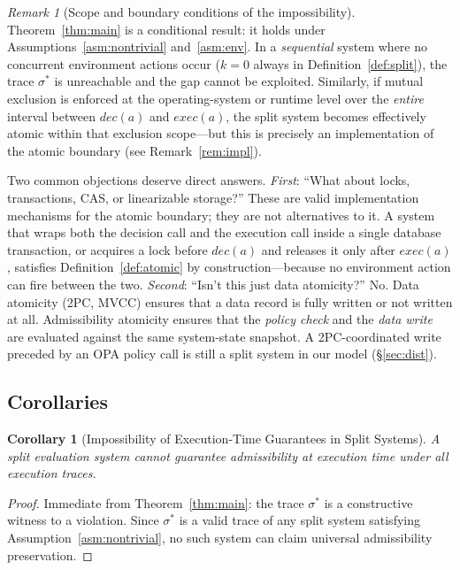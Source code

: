 \documentclass[11pt]{article}
\theoremstyle{plain}
\newtheorem{corollary}[theorem]{Corollary}
\theoremstyle{definition}
\theoremstyle{remark}
\newtheorem{remark}[theorem]{Remark}
\begin{document}
\begin{remark}[Scope and boundary conditions of the impossibility]
\label{rem:scope}
Theorem~\ref{thm:main} is a conditional result: it holds under
Assumptions~\ref{asm:nontrivial} and~\ref{asm:env}.  In a \emph{sequential}
system where no concurrent environment actions occur ($k = 0$ always in
Definition~\ref{def:split}), the trace $\sigma^*$ is unreachable and the
gap cannot be exploited.  Similarly, if mutual exclusion is enforced at the
operating-system or runtime level over the \emph{entire} interval between
$\mathit{dec}(a)$ and $\mathit{exec}(a)$, the split system becomes effectively
atomic within that exclusion scope---but this is precisely an implementation
of the atomic boundary (see Remark~\ref{rem:impl}).

Two common objections deserve direct answers.  \emph{First}: ``What about
locks, transactions, CAS, or linearizable storage?''  These are valid
implementation mechanisms for the atomic boundary; they are not alternatives
to it.  A system that wraps both the decision call and the execution call inside
a single database transaction, or acquires a lock before $\mathit{dec}(a)$ and
releases it only after $\mathit{exec}(a)$, satisfies Definition~\ref{def:atomic}
by construction---because no environment action can fire between the two.
\emph{Second}: ``Isn't this just data atomicity?''  No.  Data atomicity (2PC,
MVCC) ensures that a data record is fully written or not written at all.
Admissibility atomicity ensures that the \emph{policy check} and the
\emph{data write} are evaluated against the same system-state snapshot.
A 2PC-coordinated write preceded by an OPA policy call is still a split system
in our model (\S\ref{sec:dist}).
\end{remark}

\subsection{Corollaries}

\begin{corollary}[Impossibility of Execution-Time Guarantees in Split Systems]
\label{cor:impossibility}
A split evaluation system cannot guarantee admissibility at execution time
under all execution traces.
\end{corollary}

\begin{proof}
Immediate from Theorem~\ref{thm:main}: the trace $\sigma^*$ is a
constructive witness to a violation.  Since $\sigma^*$ is a valid trace of
any split system satisfying Assumption~\ref{asm:nontrivial}, no such system
can claim universal admissibility preservation.
\end{proof}
\end{document}
